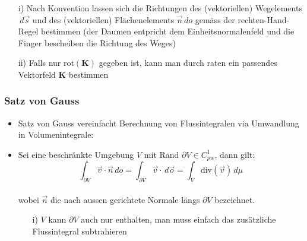 \documentclass[a3paper, 11pt, landscape]{scrartcl}
\newcommand{\diff}{\,d}
\begin{document}
\begin{multicols*}{3}
\begin{itemize}
    		\begin{itemize}
    			\item[i)] Nach Konvention lassen sich die Richtungen des (vektoriellen) Wegelements $\diff \vec{s}$ und des (vektoriellen) Flächenelements $\vec{n}\diff o$ gemäss der rechten-Hand-Regel bestimmen (der Daumen entpricht dem Einheitsnormalenfeld und die Finger bescheiben die Richtung des Weges)
    			\item[ii)] Falls nur $\text{rot}(\textbf{K})$ gegeben ist, kann man durch raten ein passendes Vektorfeld $\textbf{K}$ bestimmen
    		\end{itemize}
    		\end{itemize}
    	\subsubsection{Satz von Gauss}
    		\begin{itemize}
		        \item Satz von Gauss vereinfacht Berechnung von Flussintegralen via Umwandlung in Volumenintegrale:
    		    \item Sei eine beschränkte Umgebung $V$ mit Rand $\partial V\in C^1_{pw}$, dann gilt:
    		    \begin{equation*}
    			\int_{\partial V}\vec{v} \cdot \vec{n}\diff o=\int_{\partial V}\vec{v} \cdot \diff \vec{o}=\int_V \text{div}(\vec{v})\diff \mu
    		\end{equation*} \\
    		wobei $\vec{n}$ die nach aussen gerichtete Normale längs $\partial V$ bezeichnet.
    		\begin{itemize}
    			\item[i)] $V$ kann $\partial V$ auch nur enthalten, man muss einfach das zusätzliche Flussintegral subtrahieren 
    		\end{itemize}
    		\end{itemize}
	

\end{multicols*}
\end{document}
